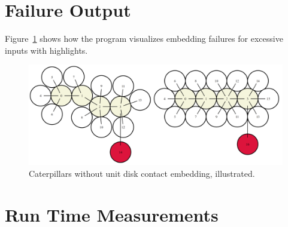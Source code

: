 \documentclass[draft,final]{vutinfth} %
\begin{document}
\section{Failure Output}

Figure~\ref{fig:failure} shows how the program visualizes embedding failures for excessive inputs with highlights.

\begin{figure}
    \centering
    \includegraphics[width=\textwidth]{graphics/failure.png}
    \caption{Caterpillars without unit disk contact embedding, illustrated.}
    \label{fig:failure}
\end{figure}

\section{Run Time Measurements}

\end{document}
